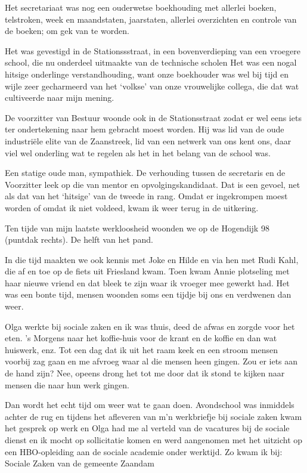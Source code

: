 \documentclass[10pt,twoside,openright]{memoir}
\begin{document}
Het secretariaat was nog een ouderwetse boekhouding met allerlei boeken, telstroken, week en maandstaten, jaarstaten, allerlei overzichten en controle van de boeken; om gek van te worden. 

Het was gevestigd in de Stationssstraat, in een bovenverdieping van een vroegere school, die nu onderdeel uitmaakte van de technische scholen Het was een nogal hitsige onderlinge verstandhouding, want onze boekhouder was wel bij tijd en wijle zeer gecharmeerd van het `volkse' van onze vrouwelijke collega, die dat wat cultiveerde naar mijn mening. 

De voorzitter van Bestuur woonde ook in de Stationsstraat zodat er wel eens iets ter ondertekening naar hem gebracht moest worden. Hij was lid van de oude industriële elite van de Zaanstreek, lid van een netwerk van ons kent ons, daar viel wel onderling wat te regelen als het in het belang van de school was. 

Een statige oude man, sympathiek. De verhouding tussen de secretaris en de Voorzitter leek op die van mentor en opvolgingskandidaat. Dat is een gevoel, net als dat van het `hitsige' van de tweede in rang. Omdat er ingekrompen moest worden of omdat ik niet voldeed, kwam ik weer terug in de uitkering.

Ten tijde van mijn laatste werkloosheid woonden we op de Hogendijk 98 (puntdak rechts). De helft van het pand.

In die tijd maakten we ook kennis met Joke en Hilde en via hen met Rudi Kahl, die af en toe op de fiets uit Friesland kwam. Toen kwam Annie plotseling met haar nieuwe vriend en dat bleek te zijn waar ik vroeger mee gewerkt had. Het was een bonte tijd, mensen woonden soms een tijdje bij ons en verdwenen dan weer. 

Olga werkte bij sociale zaken en ik was thuis, deed de afwas en zorgde voor het eten. 's Morgens naar het koffie-huis voor de krant en de koffie en dan wat huiswerk, enz. Tot een dag dat ik uit het raam keek en een stroom mensen voorbij zag gaan en me afvroeg waar al die mensen heen gingen. Zou er iets aan de hand zijn? Nee, opeens drong het tot me door dat ik stond te kijken naar mensen die naar hun werk gingen. 

Dan wordt het echt tijd om weer wat te gaan doen. Avondschool was inmiddels achter de rug en tijdens het afleveren van m'n werkbriefje bij sociale zaken kwam het gesprek op werk en Olga had me al verteld van de vacatures bij de sociale dienst en ik mocht op sollicitatie komen en werd aangenomen met het uitzicht op een HBO-opleiding aan de sociale academie onder werktijd. Zo kwam ik bij: Sociale Zaken van de gemeente Zaandam
\end{document}
